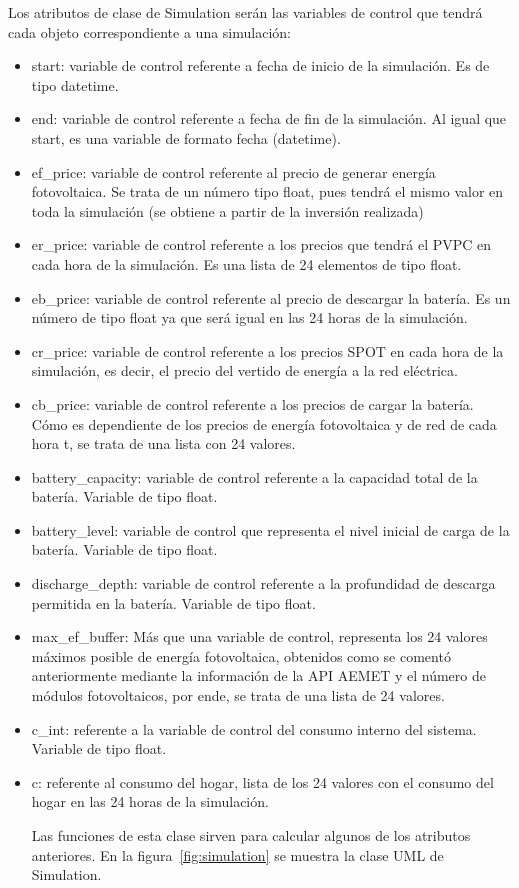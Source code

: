 Los atributos de clase de Simulation serán las variables de control que tendrá cada objeto correspondiente a una simulación:
\begin{itemize}
        \item start: variable de control referente a fecha de inicio de la simulación. Es de tipo datetime.
        \item end: variable de control referente a fecha de fin de la simulación. Al igual que start, es una variable de formato fecha (datetime).
        \item ef\_price: variable de control referente al precio de generar energía fotovoltaica. Se trata de un número tipo float, pues tendrá el mismo valor en toda la simulación (se obtiene a partir de la inversión realizada)
        \item er\_price: variable de control referente a los precios que tendrá el PVPC en cada hora de la simulación. Es una lista de 24 elementos de tipo float.
        \item eb\_price: variable de control referente al precio de descargar la batería. Es un número de tipo float ya que será igual en las 24 horas de la simulación.
        \item cr\_price: variable de control referente a los precios SPOT en cada hora de la simulación, es decir, el precio del vertido de energía a la red eléctrica.
        \item cb\_price: variable de control referente a los precios de cargar la batería. Cómo es dependiente de los precios de energía fotovoltaica y de red de cada hora t, se trata de una lista con 24 valores.
        \item battery\_capacity: variable de control referente a la capacidad total de la batería. Variable de tipo float.
        \item battery\_level: variable de control que representa el nivel inicial de carga de la batería. Variable de tipo float.
        \item discharge\_depth: variable de control referente a la profundidad de descarga permitida en la batería. Variable de tipo float.
        \item max\_ef\_buffer: Más que una variable de control, representa los 24 valores máximos posible de energía fotovoltaica, obtenidos como se comentó anteriormente mediante la información de la API AEMET y el número de módulos fotovoltaicos, por ende, se trata de una lista de 24 valores.
        \item c\_int: referente a la variable de control del consumo interno del sistema. Variable de tipo float.
        \item c: referente al consumo del hogar, lista de los 24 valores con el consumo del hogar en las 24 horas de la simulación.

Las funciones de esta clase sirven para calcular algunos de los atributos anteriores. En la figura~\ref{fig:simulation} se muestra la clase UML de Simulation.
\end{itemize}

